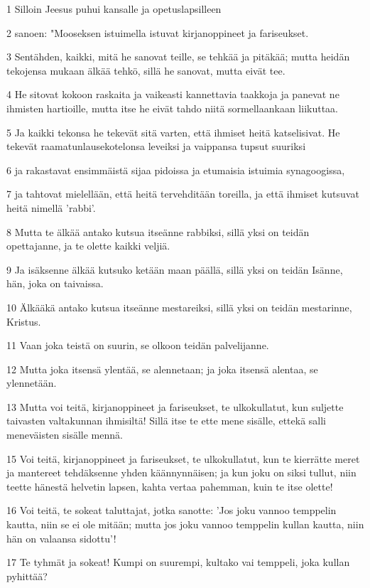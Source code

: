 \par 1 Silloin Jeesus puhui kansalle ja opetuslapsilleen
\par 2 sanoen: "Mooseksen istuimella istuvat kirjanoppineet ja fariseukset.
\par 3 Sentähden, kaikki, mitä he sanovat teille, se tehkää ja pitäkää; mutta heidän tekojensa mukaan älkää tehkö, sillä he sanovat, mutta eivät tee.
\par 4 He sitovat kokoon raskaita ja vaikeasti kannettavia taakkoja ja panevat ne ihmisten hartioille, mutta itse he eivät tahdo niitä sormellaankaan liikuttaa.
\par 5 Ja kaikki tekonsa he tekevät sitä varten, että ihmiset heitä katselisivat. He tekevät raamatunlausekotelonsa leveiksi ja vaippansa tupsut suuriksi
\par 6 ja rakastavat ensimmäistä sijaa pidoissa ja etumaisia istuimia synagoogissa,
\par 7 ja tahtovat mielellään, että heitä tervehditään toreilla, ja että ihmiset kutsuvat heitä nimellä 'rabbi'.
\par 8 Mutta te älkää antako kutsua itseänne rabbiksi, sillä yksi on teidän opettajanne, ja te olette kaikki veljiä.
\par 9 Ja isäksenne älkää kutsuko ketään maan päällä, sillä yksi on teidän Isänne, hän, joka on taivaissa.
\par 10 Älkääkä antako kutsua itseänne mestareiksi, sillä yksi on teidän mestarinne, Kristus.
\par 11 Vaan joka teistä on suurin, se olkoon teidän palvelijanne.
\par 12 Mutta joka itsensä ylentää, se alennetaan; ja joka itsensä alentaa, se ylennetään.
\par 13 Mutta voi teitä, kirjanoppineet ja fariseukset, te ulkokullatut, kun suljette taivasten valtakunnan ihmisiltä! Sillä itse te ette mene sisälle, ettekä salli meneväisten sisälle mennä.
\par 15 Voi teitä, kirjanoppineet ja fariseukset, te ulkokullatut, kun te kierrätte meret ja mantereet tehdäksenne yhden käännynnäisen; ja kun joku on siksi tullut, niin teette hänestä helvetin lapsen, kahta vertaa pahemman, kuin te itse olette!
\par 16 Voi teitä, te sokeat taluttajat, jotka sanotte: 'Jos joku vannoo temppelin kautta, niin se ei ole mitään; mutta jos joku vannoo temppelin kullan kautta, niin hän on valaansa sidottu'!
\par 17 Te tyhmät ja sokeat! Kumpi on suurempi, kultako vai temppeli, joka kullan pyhittää?
